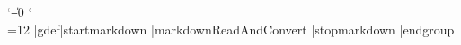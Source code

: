 %
\unprotect
\let\startmarkdown\relax
\let\stopmarkdown\relax
\def\dospecials{\do\ \do\\\do\{\do\}\do\$\do\&%
  \do\#\do\^\do\_\do\%\do\~}%

\def\markdownMakeOther{%
  \count0=128\relax
  \loop
    \catcode\count0=11\relax
    \advance\count0 by 1\relax
  \ifnum\count0<256\repeat
  \catcode`|=12}%
\def\markdownInfo#1{\writestatus{markdown}{#1.}}%
\def\markdownWarning#1{\writestatus{markdown\space warn}{#1.}}%
\begingroup
  \catcode`\|=0%
  \catcode`\\=12%
  |gdef|startmarkdown{%
    |markdownReadAndConvert{\stopmarkdown}%
                           {|stopmarkdown}}%
|endgroup
\def\markdownRendererLineBreakPrototype{\blank}%
\def\markdownRendererLeftBracePrototype{\textbraceleft}%
\def\markdownRendererRightBracePrototype{\textbraceright}%
